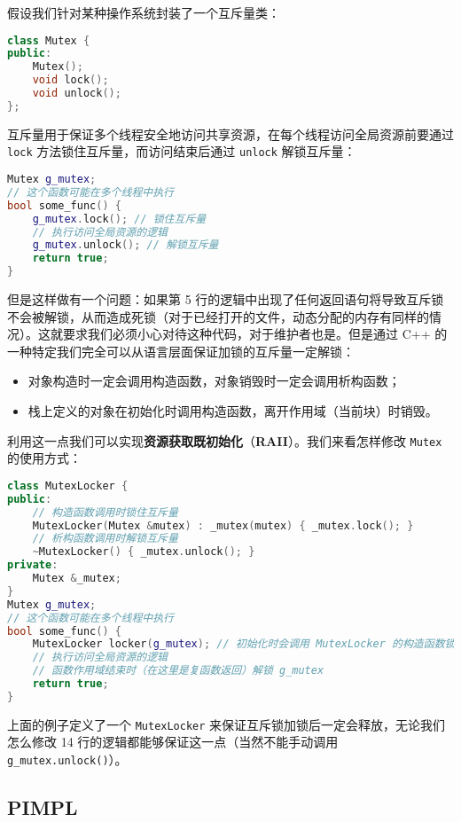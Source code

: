 \documentclass[hyperref,UTF8]{article}
\begin{document}
假设我们针对某种操作系统封装了一个互斥量类：
\begin{lstlisting}[language=c++]
class Mutex {
public:
    Mutex();
    void lock();
    void unlock();
};
\end{lstlisting}
互斥量用于保证多个线程安全地访问共享资源，在每个线程访问全局资源前要通过 \texttt{lock} 方法锁住互斥量，而访问结束后通过 \texttt{unlock} 解锁互斥量：
\begin{lstlisting}[language=c++]
Mutex g_mutex;
// 这个函数可能在多个线程中执行
bool some_func() {
    g_mutex.lock(); // 锁住互斥量
    // 执行访问全局资源的逻辑
    g_mutex.unlock(); // 解锁互斥量
    return true;
}
\end{lstlisting}
但是这样做有一个问题：如果第 5 行的逻辑中出现了任何返回语句将导致互斥锁不会被解锁，从而造成死锁（对于已经打开的文件，动态分配的内存有同样的情况）。这就要求我们必须小心对待这种代码，对于维护者也是。但是通过 C++ 的一种特定我们完全可以从语言层面保证加锁的互斥量一定解锁：
\begin{itemize}
  \item 对象构造时一定会调用构造函数，对象销毁时一定会调用析构函数；
  \item 栈上定义的对象在初始化时调用构造函数，离开作用域（当前块）时销毁。
\end{itemize}
利用这一点我们可以实现\textbf{资源获取既初始化}（\textbf{RAII}）。我们来看怎样修改 \texttt{Mutex} 的使用方式：
\begin{lstlisting}[language=c++]
class MutexLocker {
public:
    // 构造函数调用时锁住互斥量
    MutexLocker(Mutex &mutex) : _mutex(mutex) { _mutex.lock(); }
    // 析构函数调用时解锁互斥量
    ~MutexLocker() { _mutex.unlock(); }
private:
    Mutex &_mutex;
}
Mutex g_mutex;
// 这个函数可能在多个线程中执行
bool some_func() {
    MutexLocker locker(g_mutex); // 初始化时会调用 MutexLocker 的构造函数锁住 g_mutex
    // 执行访问全局资源的逻辑
    // 函数作用域结束时（在这里是复函数返回）解锁 g_mutex
    return true;
}
\end{lstlisting}
上面的例子定义了一个 \texttt{MutexLocker} 来保证互斥锁加锁后一定会释放，无论我们怎么修改 14 行的逻辑都能够保证这一点（当然不能手动调用 \texttt{g\_mutex.unlock()}）。

\subsection{PIMPL}


\end{document}
